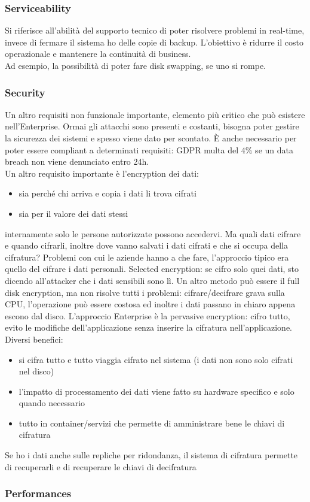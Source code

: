 \documentclass{article}
\begin{document}
\subsubsection{Serviceability}
Si riferisce all'abilità del supporto tecnico di poter risolvere problemi in real-time, invece di fermare il sistema ho delle copie di backup. L'obiettivo è ridurre il costo operazionale e mantenere la continuità di business.\\ Ad esempio, la possibilità di poter fare disk swapping, se uno si rompe.
\subsubsection{Security}
Un altro requisiti non funzionale importante, elemento più critico che può esistere nell'Enterprise. Ormai gli attacchi sono presenti e costanti, bisogna poter gestire la sicurezza dei sistemi e spesso viene dato per scontato. È anche necessario per poter essere compliant a determinati requisiti: GDPR multa del $4\%$ se un data breach non viene denunciato entro 24h.\\ Un altro requisito importante è l'encryption dei dati:
\begin{itemize}
\item sia perché chi arriva e copia i dati li trova cifrati
\item sia per il valore dei dati stessi
\end{itemize}
internamente solo le persone autorizzate possono accedervi. Ma quali dati cifrare e quando cifrarli, inoltre dove vanno salvati i dati cifrati e che si occupa della cifratura? Problemi con cui le aziende hanno a che fare, l'approccio tipico era quello del cifrare i dati personali. Selected encryption: se cifro solo quei dati, sto dicendo all'attacker che i dati sensibili sono lì. Un altro metodo può essere il full disk encryption, ma non risolve tutti i problemi: cifrare/decifrare grava sulla CPU, l'operazione può essere costosa ed inoltre i dati passano in chiaro appena escono dal disco. L'approccio Enterprise è la pervasive encryption: cifro tutto, evito le modifiche dell'applicazione senza inserire la cifratura nell'applicazione. Diversi benefici:
\begin{itemize}
\item si cifra tutto e tutto viaggia cifrato nel sistema (i dati non sono solo cifrati nel disco)
\item l'impatto di processamento dei dati viene fatto su hardware specifico e solo quando necessario
\item tutto in container/servizi che permette di amministrare bene le chiavi di cifratura
\end{itemize}
Se ho i dati anche sulle repliche per ridondanza, il sistema di cifratura permette di recuperarli e di recuperare le chiavi di decifratura
\subsubsection{Performances}
\end{document}
